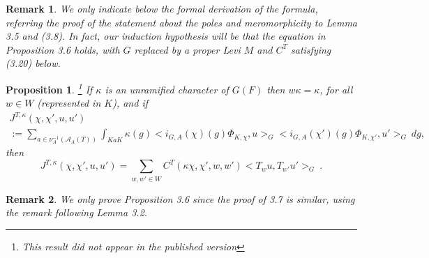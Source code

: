 \documentclass[12pt]{article}
\newtheorem{proposition}[lemma]{Proposition}
\newtheorem{remark}{Remark}
\begin{document}
\begin{remark}
We only indicate below the formal derivation of the formula, referring the proof of the statement about the poles and meromorphicity to Lemma 3.5 and (3.8). In fact, our induction hypothesis will be that the equation in Proposition 3.6 holds, with $G$ replaced by a proper Levi $M$ and $C^T$ satisfying (3.20) below.
\end{remark}

\begin{proposition}
\footnote{This result did not appear in the published version}
If $\kappa$ is an unramified character of $G(F)$ then $w\kappa=\kappa$, for all $w\in W$ (represented in $K$), and if
\[
\begin{array}{c}
J^{T,\kappa}(\chi,\chi',u,u')\\
:=\sum_{a\in\nu_A^{-1}(\mathcal{A}_A(T))}\int_{KaK}\kappa(g)<i_{G,A}(\chi)(g)\Phi_{K,\chi},u>_G<i_{G,A}(\chi')(g)\Phi_{K,\chi'},u'>_G\ dg,
\end{array}
\]
then
\[
J^{T,\kappa}(\chi,\chi',u,u')=\sum_{w,w'\in W}C^T(\kappa\chi,\chi',w,w')<T_wu,T_{w'}u'>_G\ .
\]
\end{proposition}

\begin{remark}
We only prove Proposition 3.6 since the proof of 3.7 is similar, using the remark following Lemma 3.2.
\end{remark}
\end{document}
